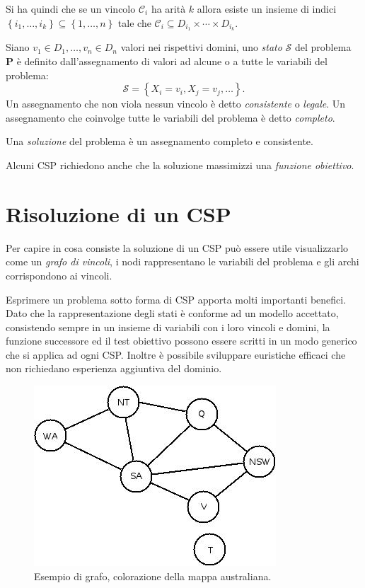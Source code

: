 Si ha quindi che se un vincolo $\mathcal{C}_i$ ha arità $k$ allora esiste un
insieme di indici $\left\{ i_1, \ldots, i_k \right\} \subseteq 
\left\{ 1, \ldots, n \right\}$ tale che $\mathcal{C}_i \subseteq 
D_{i_1} \times \cdots \times D_{i_k}$.

\begin{defi}Siano $v_1 \in D_1, \ldots, v_n \in D_n$ valori nei
rispettivi domini,
uno \emph{stato} $\mathcal{S}$ del problema $\mathbf{P}$ è definito
dall'assegnamento di valori ad alcune o a tutte le variabili del problema:
\[
\mathcal{S} = \left\{ X_i = v_i, X_j = v_j, \ldots \right\}.
\]
Un assegnamento che non viola nessun vincolo è detto \emph{consistente} o
\emph{legale}. Un assegnamento che coinvolge tutte le variabili del problema
è detto \emph{completo}. 
\end{defi}

\begin{defi}
Una \emph{soluzione} del problema è un assegnamento completo e consistente.
\end{defi}

Alcuni CSP richiedono anche che la soluzione massimizzi una \emph{funzione
obiettivo}.

\section{Risoluzione di un CSP}
Per capire in cosa consiste la soluzione di un CSP può essere utile
visualizzarlo come un \emph{grafo di vincoli}, i nodi rappresentano le variabili
del problema e gli archi corrispondono ai vincoli.

Esprimere un problema sotto forma di CSP apporta molti importanti benefici.
Dato che la rappresentazione degli stati è conforme ad un modello accettato,
consistendo sempre in un insieme di variabili con i loro vincoli e domini,
la funzione successore ed il test obiettivo possono essere scritti in un
modo generico che si applica ad ogni CSP. Inoltre è possibile sviluppare
euristiche efficaci che non richiedano esperienza aggiuntiva del dominio.

\begin{figure}\label{figAustralia}
\centering
\includegraphics[scale=.5]{img/Australia.jpeg}
\caption{Esempio di grafo, colorazione della mappa australiana.}
\end{figure}

